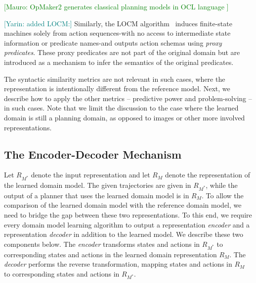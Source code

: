 \documentclass{article}
\theoremstyle{definition}
\theoremstyle{remark}
\newcommand{\realm}{\ensuremath{M^*}\xspace}
\newcommand{\mauro}[1]{{\textcolor{green}{[Mauro: #1]}}}
\newcommand{\yarin}[1]{{\textcolor{teal}{[Yarin: #1]}}}
\begin{document}
\mauro{OpMaker2 generates classical planning models in OCL language \cite{mccluskey2010action}}

\yarin{added LOCM:}
Similarly, the LOCM algorithm~\citep{cresswell2013acquiring} induces finite-state machines solely from action sequences-with no access to intermediate state information or predicate names-and outputs action schemas using \emph{proxy predicates}. 
These proxy predicates are not part of the original domain but are introduced as a mechanism to infer the semantics of the original predicates. 


The syntactic similarity metrics are not relevant in such cases, where the representation is intentionally different from the reference model. Next, we describe how to apply the other metrics -- predictive power and problem-solving -- in such cases. 
Note that we limit the discussion to the case where the learned domain is still a planning domain, as opposed to images or other more involved representations. 

\subsection{The Encoder-Decoder Mechanism}
Let $R_{\realm}$ denote the input representation and let $R_M$ denote the representation of the learned domain model. 
The given trajectories are given in $R_{\realm}$, 
while the output of a planner that uses the learned domain model is in $R_M$. 
To allow the comparison of the learned domain model with the reference domain model, we need to bridge the gap between these two representations. 
To this end, we require every domain model learning algorithm to output 
a representation \emph{encoder} and a representation \emph{decoder} in addition to the learned model. We describe these two components below.  
The \emph{encoder} transforms states and actions in $R_{\realm}$ to corresponding states and actions in the learned domain representation $R_M$. 
The \emph{decoder} performs the reverse transformation, mapping states and actions in $R_M$ to corresponding states and actions in $R_\realm$.
\end{document}
